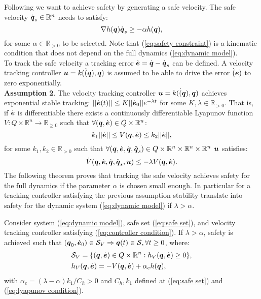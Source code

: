 Following \cite{mf_cbf} we want to achieve safety by generating a safe velocity. The safe velocity $\dot{{\boldsymbol{q}}}_s \in \mathbb{R}^n$ needs to satisfy:
\begin{equation} \label{eq:safety constraint}
    \nabla h({\boldsymbol{q}})\dot{{\boldsymbol{q}}}_s \geq -\alpha h({\boldsymbol{q}}),
\end{equation}
for some $\alpha \in \mathbb{R}_{>0}$ to be selected. Note that (\ref{eq:safety constraint}) is a kinematic condition that does not depend on the full dynamics (\ref{eq:dynamic model}).\\
To track the safe velocity a tracking error $\dot{\boldsymbol{e}} = \dot{{\boldsymbol{q}}}-\dot{{\boldsymbol{q}}}_s$ can be defined. A velocity tracking controller $\boldsymbol{u} = k(\dot({\boldsymbol{q}}),{\boldsymbol{q}})$ is assumed to be able to drive the error $\dot(\boldsymbol{e})$ to zero exponentially.\\
\textbf{Assumption 2}. The velocity tracking controller $\boldsymbol{u} = k(\dot({\boldsymbol{q}}),{\boldsymbol{q}})$ achieves exponential stable tracking: $||\dot{\boldsymbol{e}}(t)||\leq K ||\dot{\boldsymbol{e}}_0|| e^{-\lambda t}$ for some $K,\lambda \in \mathbb{R}_{>0}$. That is, if $\dot{\boldsymbol{e}}$ is differentiable there exists a continuously differentiable Lyapunov function $V: Q \times \mathbb{R}^n \rightarrow \mathbb{R}_{\geq 0}$ such that $\forall({\boldsymbol{q}},\dot{\boldsymbol{e}})\in Q \times \mathbb{R}^n$:
\begin{equation} \label{eq:lyapunov condition}
    k_1 || \dot{\boldsymbol{e}}|| \leq V({\boldsymbol{q}}, \dot{\boldsymbol{e}}) \leq k_2 || \dot{\boldsymbol{e}}||,
\end{equation}
for some $k_1,k_2\in \mathbb{R}_{>0}$ such that $\forall({\boldsymbol{q}},\dot{\boldsymbol{e}},\dot{{\boldsymbol{q}}},\ddot{{\boldsymbol{q}}}_s)\in Q \times \mathbb{R}^n \times \mathbb{R}^n \times \mathbb{R}^n$ $\boldsymbol{u}$ satisfies:
\begin{equation} \label{eq:controller condition}
    \dot{V}({\boldsymbol{q}},\dot{\boldsymbol{e}},\dot{{\boldsymbol{q}}},\ddot{{\boldsymbol{q}}}_s,\boldsymbol{u}) \leq -\lambda V({\boldsymbol{q}},\dot{\boldsymbol{e}}).
\end{equation}
The following theorem proves that tracking the safe velocity achieves safety for the full dynamics if the parameter $\alpha$ is chosen small enough. In particular for a tracking controller satisfying the previous assumption stability translate into safety for the dynamic system (\ref{eq:dynamic model}) if $\lambda > \alpha$. 
\begin{theorem}\label{th:alpha limit}
    Consider system (\ref{eq:dynamic model}), safe set (\ref{eq:safe set}), and velocity tracking controller satisfying (\ref{eq:controller condition}). If $\lambda > \alpha$, safety is achieved such that $({\boldsymbol{q}}_0,\dot{\boldsymbol{e}}_0)\in \mathcal{S}_V \Rightarrow {\boldsymbol{q}}(t) \in \mathcal{S}, \forall t\geq 0$, where:
    \begin{align}
        &\mathcal{S}_V = \{ ({\boldsymbol{q}},\dot{\boldsymbol{e}})\in Q \times \mathbb{R}^n: h_V({\boldsymbol{q}},\dot{\boldsymbol{e}})\geq 0 \},\\
        &h_V({\boldsymbol{q}},\dot{\boldsymbol{e}}) = -V({\boldsymbol{q}},\dot{\boldsymbol{e}})+ \alpha_e h({\boldsymbol{q}}), \label{eq:h_V}
    \end{align}
    with $\alpha_e = (\lambda - \alpha)k_1/C_h > 0$ and $C_h,k_1$ defined at (\ref{eq:safe set}) and (\ref{eq:lyapunov condition}).
\end{theorem}
